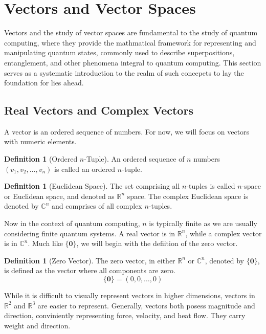 \documentclass[12pt]{article}
\theoremstyle{definition}
\newtheorem{definition}[theorem]{Definition}
\begin{document}
\break


\section{Vectors and Vector Spaces}

Vectors and the study of vector spaces are fundamental to the study of quantum computing, where they provide the mathmatical framework for representing and manipulating quantum states, commonly used to describe superpositions, entanglement, and other phenomena integral to quantum computing. This section serves as a systematic introduction to the realm of such concepets to lay the foundation for lies ahead. 

\subsection{Real Vectors and Complex Vectors}

A vector is an ordered sequence of numbers. For now, we will focus on vectors with numeric elements. 

\begin{definition}[Ordered $n$-Tuple]
    An ordered sequence of $n$ numbers $(v_1, v_2, \ldots, v_n)$ is called an ordered $n$-tuple. 
\end{definition}

\begin{definition}[Euclidean Space]
    The set comprising all $n$-tuples is called $n$-space or Euclidean space, and denoted as $\mathbb{R}^n$ space. The complex Euclidean space is denoted by $\mathbb{C}^n$ and comprises of all complex $n$-tuples. 
\end{definition}

Now in the context of quantum computing, $n$ is typically finite as we are usually considering finite quantum systems. A real vector is in $\mathbb{R}^n$, while a complex vector is in $\mathbb{C}^n$. Much like $\{\mathbf{0}\}$, we will begin with the defiition of the zero vector.

\begin{definition}[Zero Vector]
    The zero vector, in either $\mathbb{R}^n$ or $\mathbb{C}^n$, denoted by $\{\mathbf{0}\}$, is defined as the vector where all components are zero. $$\{\mathbf{0}\} = (0, 0, \ldots, 0)$$
\end{definition}

While it is difficult to visually represent vectors in higher dimensions, vectors in $\mathbb{R}^2$ and $\mathbb{R}^3$ are easier to represent. Generally, vectors both posess magnitude and direction, conviniently representing force, velocity, and heat flow. They carry weight and direction. 
\end{document}
